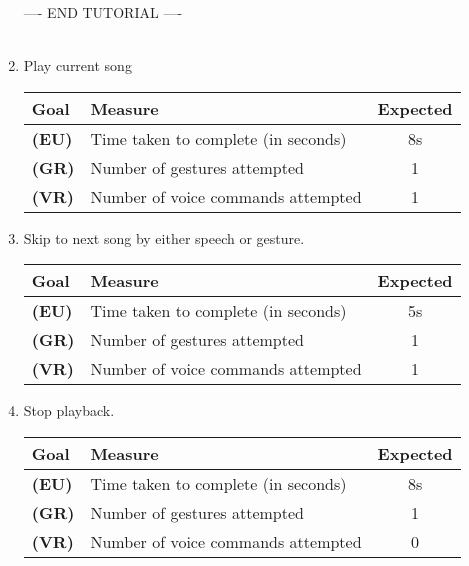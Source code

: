 \documentclass[12pt,letterpaper]{article}
\begin{document}
\begin{enumerate}
---- END TUTORIAL ----\\ \\

\item Play current song
\begin{center}\begin{tabular}{l|l|c}
\textbf{Goal} & \textbf{Measure} & \textbf{Expected} \\
\hline
\textbf{(EU)} & Time taken to complete (in seconds) & 8s \\
\hline
\textbf{(GR)} & Number of gestures attempted & 1 \\
\hline
\textbf{(VR)} & Number of voice commands attempted & 1 \\
\hline
\end{tabular}\end{center}




\item Skip to next song by either speech or gesture.
\begin{center}\begin{tabular}{l|l|c}
\textbf{Goal} & \textbf{Measure} & \textbf{Expected} \\
\hline
\textbf{(EU)} & Time taken to complete (in seconds) & 5s \\
\hline
\textbf{(GR)} & Number of gestures attempted & 1 \\
\hline
\textbf{(VR)} & Number of voice commands attempted & 1 \\
\hline
\end{tabular}\end{center}

\item Stop playback.
\begin{center}\begin{tabular}{l|l|c}
\textbf{Goal} & \textbf{Measure} & \textbf{Expected} \\
\hline
\textbf{(EU)} & Time taken to complete (in seconds) & 8s \\
\hline
\textbf{(GR)} & Number of gestures attempted & 1 \\
\hline
\textbf{(VR)} & Number of voice commands attempted & 0 \\
\hline
\end{tabular}\end{center}


\end{enumerate}
\end{document}
